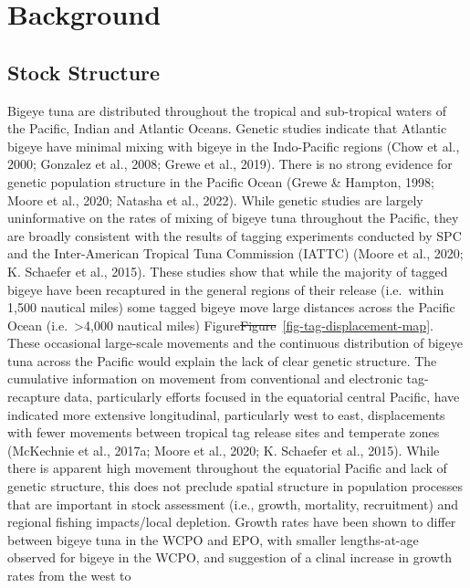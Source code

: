 \documentclass[
  english,
  a4paper,
  a4paper,
  11pt]{SCreport}
\providecommand{\DIFdel}[1]{{\protect\color{red}\sout{#1}}}                      %
\providecommand{\DIFdelbegin}{} %
\providecommand{\DIFdelend}{} %
\newcommand{\DIFscaledelfig}{0.5}
\newlength{\DIFdelgraphicswidth} %
\newlength{\DIFdelgraphicsheight} %
\newcommand{\DIFdelincludegraphics}[2][]{%
\sbox{\DIFdelgraphicsbox}{\DIFOincludegraphics[#1]{#2}}%
\settoboxwidth{\DIFdelgraphicswidth}{\DIFdelgraphicsbox} %
\settoboxtotalheight{\DIFdelgraphicsheight}{\DIFdelgraphicsbox} %
\scalebox{\DIFscaledelfig}{%
\parbox[b]{\DIFdelgraphicswidth}{\usebox{\DIFdelgraphicsbox}\\[-\baselineskip] \rule{\DIFdelgraphicswidth}{0em}}\llap{\resizebox{\DIFdelgraphicswidth}{\DIFdelgraphicsheight}{%
\setlength{\unitlength}{\DIFdelgraphicswidth}%
\begin{picture}(1,1)%
\thicklines\linethickness{2pt} %
{\color[rgb]{1,0,0}\put(0,0){\framebox(1,1){}}}%
{\color[rgb]{1,0,0}\put(0,0){\line( 1,1){1}}}%
{\color[rgb]{1,0,0}\put(0,1){\line(1,-1){1}}}%
\end{picture}%
}\hspace*{3pt}}} %
} %
\DeclareRobustCommand{\DIFdelbegin}{\DIFOdelbegin \let\includegraphics\DIFdelincludegraphics} %
\DeclareRobustCommand{\DIFdelend}{\DIFOaddend \let\includegraphics\DIFOincludegraphics} %
\begin{document}
\section{Background}\label{sec-background}

\subsection{Stock Structure}\label{sec-stock-structure}

Bigeye tuna are distributed throughout the tropical and sub-tropical
waters of the Pacific, Indian and Atlantic Oceans. Genetic studies
indicate that Atlantic bigeye have minimal mixing with bigeye in the
Indo-Pacific regions (Chow et al., 2000; Gonzalez et al., 2008; Grewe et
al., 2019). There is no strong evidence for genetic population structure
in the Pacific Ocean (Grewe \& Hampton, 1998; Moore et al., 2020;
Natasha et al., 2022). While genetic studies are largely uninformative
on the rates of mixing of bigeye tuna throughout the Pacific, they are
broadly consistent with the results of tagging experiments conducted by
SPC and the Inter-American Tropical Tuna Commission (IATTC) (Moore et
al., 2020; K. Schaefer et al., 2015). These studies show that while the
majority of tagged bigeye have been recaptured in the general regions of
their release (i.e.~within 1,500 nautical miles) some tagged bigeye move
large distances across the Pacific Ocean (i.e.~\textgreater4,000
nautical miles) Figure\DIFdelbegin \DIFdel{Figure}\DIFdelend ~\ref{fig-tag-displacement-map}. These occasional
large-scale movements and the continuous distribution of bigeye tuna
across the Pacific would explain the lack of clear genetic structure.
The cumulative information on movement from conventional and electronic
tag-recapture data, particularly efforts focused in the equatorial
central Pacific, have indicated more extensive longitudinal,
particularly west to east, displacements with fewer movements between
tropical tag release sites and temperate zones (McKechnie et al., 2017a;
Moore et al., 2020; K. Schaefer et al., 2015). While there is apparent
high movement throughout the equatorial Pacific and lack of genetic
structure, this does not preclude spatial structure in population
processes that are important in stock assessment (i.e., growth,
mortality, recruitment) and regional fishing impacts/local depletion.
Growth rates have been shown to differ between bigeye tuna in the WCPO
and EPO, with smaller lengths-at-age observed for bigeye in the WCPO,
and suggestion of a clinal increase in growth rates from the west to
\end{document}
